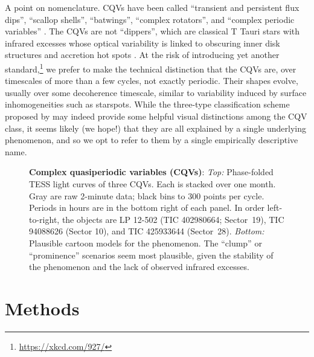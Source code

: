 \documentclass[11pt,twocolumn,tighten]{aastex63}
\begin{document}
A point on nomenclature.  CQVs have been called ``transient and
persistent flux dips'', ``scallop shells'', ``batwings'',
\citep{2017AJ....153..152S,2018AJ....155...63S} ``complex rotators'',
\citep{2019ApJ...876..127Z,2022AJ....163..144G,2023ApJ...945..114P}
and ``complex periodic variables'' \citep{2023MNRAS.518.2921K}.  The
CQVs are not ``dippers'', which are classical T Tauri stars with
infrared excesses whose optical variability is linked to obscuring
inner disk structures and accretion hot spots
\citep{2014AJ....147...82C,2021ApJ...908...16R}.  At the risk of
introducing yet another
standard,\footnote{\url{https://xkcd.com/927/}} we prefer to make the
technical distinction that the CQVs are, over timescales of more than
a few cycles, not exactly periodic.  Their shapes evolve, usually over
some decoherence timescale, similar to variability induced by surface
inhomogeneities such as starspots.  While the three-type
classification scheme proposed by \citet{2017AJ....153..152S} may
indeed provide some helpful visual distinctions among the CQV class,
it seems likely (we hope!) that they are all explained by a single
underlying phenomenon, and so we opt to refer to them by a single
empirically descriptive name.

\begin{figure*}[!t]
	\begin{center}
		
		\vspace{-0.4cm}
	\end{center}
	\caption{
		{\bf Complex quasiperiodic variables (CQVs)}:
		{\it Top:} Phase-folded TESS light curves of three CQVs.  Each is
		stacked over one month.  Gray are raw 2-minute data; black bins to
		300 points per cycle.  Periods in hours are in the bottom right of
		each panel.  In order left-to-right, the objects are LP 12-502
		(TIC 402980664; Sector~19), TIC 94088626 (Sector 10), and TIC
		425933644 (Sector~28).
		{\it Bottom:} Plausible cartoon models for the phenomenon.  The
		``clump'' or ``prominence'' scenarios seem most plausible, given
		the stability of the phenomenon and the lack of observed infrared
		excesses.
	}
	\label{fig:f1}
\end{figure*}



\section{Methods}
\label{sec:methods}
\end{document}
